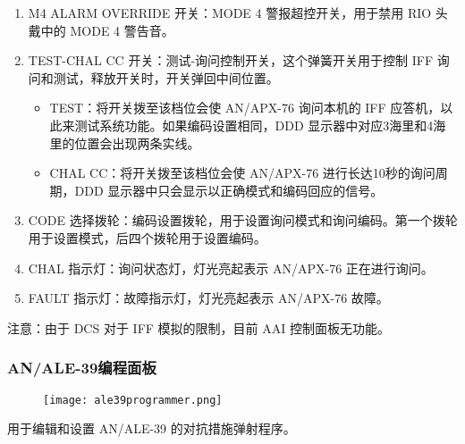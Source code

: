 \begin{enumerate}
  \item M4 ALARM OVERRIDE 开关：MODE 4 警报超控开关，用于禁用 RIO 头戴中的 MODE 4 警告音。
  \item TEST-CHAL CC 开关：测试-询问控制开关，这个弹簧开关用于控制 IFF 询问和测试，释放开关时，开关弹回中间位置。
  \begin{itemize}
    \item TEST：将开关拨至该档位会使 AN/APX-76 询问本机的 IFF 应答机，以此来测试系统功能。如果编码设置相同，DDD 显示器中对应3海里和4海里的位置会出现两条实线。
    \item CHAL CC：将开关拨至该档位会使 AN/APX-76 进行长达10秒的询问周期，DDD 显示器中只会显示以正确模式和编码回应的信号。
  \end{itemize}
  \item CODE 选择拨轮：编码设置拨轮，用于设置询问模式和询问编码。第一个拨轮用于设置模式，后四个拨轮用于设置编码。
  \item CHAL 指示灯：询问状态灯，灯光亮起表示 AN/APX-76 正在进行询问。
  \item FAULT 指示灯：故障指示灯，灯光亮起表示 AN/APX-76 故障。
\end{enumerate}
注意：由于 DCS 对于 IFF 模拟的限制，目前 AAI 控制面板无功能。

\subsubsection{AN/ALE-39编程面板}
\begin{figure}[htb]
  \center
  \texttt{[image: ale39programmer.png]}
\end{figure}
用于编辑和设置 AN/ALE-39 的对抗措施弹射程序。

